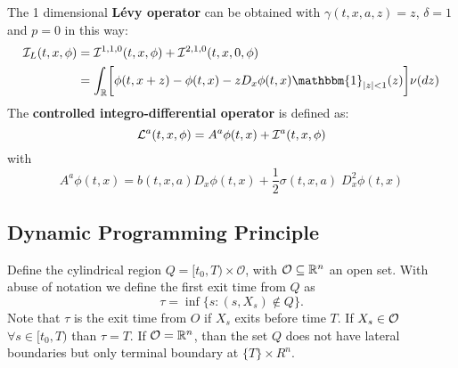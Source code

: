 \noindent
The 1 dimensional \textbf{Lévy operator} can be obtained with $\gamma(t,x,a,z) = z$, $\delta = 1$ and $p=0$ in this way:
\begin{align*}
\mathcal{I}_L(t,x,\phi) &= \mathcal{I}^{1,1,0}(t,x,\phi) + \mathcal{I}^{2,1,0}(t,x,0,\phi)\\  
                   &= \int_{\R} \biggl[ \phi(t,x+ z) - \phi(t,x) - z D_x \phi(t,x) \mathbbm{1}_{|z|<1}(z) \biggr] \nu(dz) 
\end{align*}
The \textbf{controlled integro-differential operator} is defined as:
\begin{equation}\label{int_diff_oper}
 \mathcal{L}^{a}(t,x,\phi) = A^{a} \phi(t,x) + \mathcal{I}^{a}(t,x,\phi)
\end{equation}
with 
$$A^{a} \phi(t,x) = b(t,x,a) D_x \phi(t,x) + \frac{1}{2} \sigma(t,x,a) \; D_x^2 \phi(t,x) $$



\subsection{Dynamic Programming Principle}

Define the cylindrical region $Q = [t_0,T) \times \mathcal{O}$, with $\mathcal{O} \subseteq \mathbb{R}^n$ an open set. 
With abuse of notation we define the first exit time from $Q$ as 
\begin{equation}\label{exit_time_def}
 \tau = \inf \{ s: (s,X_s) \not\in Q \}. 
\end{equation}
Note that $\tau$ is the exit time from $O$ if $X_s$ exits before time $T$. If $X_s \in \mathcal{O}$ $\forall s \in [t_0,T)$ than $\tau = T$. If $\mathcal{O} = \mathbb{R}^n$, than the set $Q$ 
does not have lateral boundaries but only terminal boundary at $\{ T \} \times R^n$.

